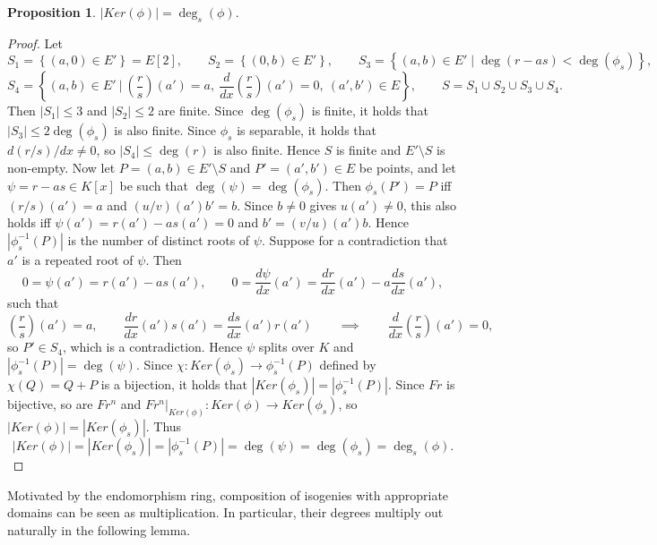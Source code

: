 \documentclass{article}
\newcommand{\val}[1]{\left. #1 \right\rvert}
\newcommand{\rb}[1]{\left( #1 \right)}
\renewcommand{\sb}[1]{\left[ #1 \right]}
\newcommand{\cb}[1]{\left\{ #1 \right\}}
\newcommand{\abs}[1]{\left\lvert #1 \right\rvert}
\theoremstyle{definition}\newtheorem*{definition}{Definition}
\theoremstyle{definition}\newtheorem*{example}{Example}
\theoremstyle{definition}\newtheorem*{remark}{Remark}
\newtheorem{proposition}{Proposition}[subsection]
\begin{document}
\begin{proposition}
$ \abs{Ker\rb{\phi}} = \deg_s\rb{\phi} $.
\end{proposition}

\begin{proof}
Let
$$ S_1 = \cb{\rb{a, 0} \in E'} = E\sb{2}, \qquad S_2 = \cb{\rb{0, b} \in E'}, \qquad S_3 = \cb{\rb{a, b} \in E' \mid \deg\rb{r - as} < \deg\rb{\phi_s}}, $$
$$ S_4 = \cb{\rb{a, b} \in E' \ \Bigg| \ \rb{\dfrac{r}{s}}\rb{a'} = a, \ \dfrac{d}{dx}\rb{\dfrac{r}{s}}\rb{a'} = 0, \ \rb{a', b'} \in E}, \qquad S = S_1 \cup S_2 \cup S_3 \cup S_4. $$
Then $ \abs{S_1} \le 3 $ and $ \abs{S_2} \le 2 $ are finite. Since $ \deg\rb{\phi_s} $ is finite, it holds that $ \abs{S_3} \le 2\deg\rb{\phi_s} $ is also finite. Since $ \phi_s $ is separable, it holds that $ d\rb{r / s} / dx \ne 0 $, so $ \abs{S_4} \le \deg\rb{r} $ is also finite. Hence $ S $ is finite and $ E' \setminus S $ is non-empty. Now let $ P = \rb{a, b} \in E' \setminus S $ and $ P' = \rb{a', b'} \in E $ be points, and let $ \psi = r - as \in K\sb{x} $ be such that $ \deg\rb{\psi} = \deg\rb{\phi_s} $. Then $ \phi_s\rb{P'} = P $ iff $ \rb{r / s}\rb{a'} = a $ and $ \rb{u / v}\rb{a'}b' = b $. Since $ b \ne 0 $ gives $ u\rb{a'} \ne 0 $, this also holds iff $ \psi\rb{a'} = r\rb{a'} - as\rb{a'} = 0 $ and $ b' = \rb{v / u}\rb{a'}b $. Hence $ \abs{\phi_s^{-1}\rb{P}} $ is the number of distinct roots of $ \psi $. Suppose for a contradiction that $ a' $ is a repeated root of $ \psi $. Then
$$ 0 = \psi\rb{a'} = r\rb{a'} - as\rb{a'}, \qquad 0 = \dfrac{d\psi}{dx}\rb{a'} = \dfrac{dr}{dx}\rb{a'} - a\dfrac{ds}{dx}\rb{a'}, $$
such that
$$ \rb{\dfrac{r}{s}}\rb{a'} = a, \qquad \dfrac{dr}{dx}\rb{a'}s\rb{a'} = \dfrac{ds}{dx}\rb{a'}r\rb{a'} \qquad \implies \qquad \dfrac{d}{dx}\rb{\dfrac{r}{s}}\rb{a'} = 0, $$
so $ P' \in S_4 $, which is a contradiction. Hence $ \psi $ splits over $ K $ and $ \abs{\phi_s^{-1}\rb{P}} = \deg\rb{\psi} $. Since $ \chi : Ker\rb{\phi_s} \to \phi_s^{-1}\rb{P} $ defined by $ \chi\rb{Q} = Q + P $ is a bijection, it holds that $ \abs{Ker\rb{\phi_s}} = \abs{\phi_s^{-1}\rb{P}} $. Since $ Fr $ is bijective, so are $ Fr^n $ and $ \val{Fr^n}_{Ker\rb{\phi}} : Ker\rb{\phi} \to Ker\rb{\phi_s} $, so $ \abs{Ker\rb{\phi}} = \abs{Ker\rb{\phi_s}} $. Thus
$$ \abs{Ker\rb{\phi}} = \abs{Ker\rb{\phi_s}} = \abs{\phi_s^{-1}\rb{P}} = \deg\rb{\psi} = \deg\rb{\phi_s} = \deg_s\rb{\phi}. $$
\end{proof}

Motivated by the endomorphism ring, composition of isogenies with appropriate domains can be seen as multiplication. In particular, their degrees multiply out naturally in the following lemma.
\end{document}
